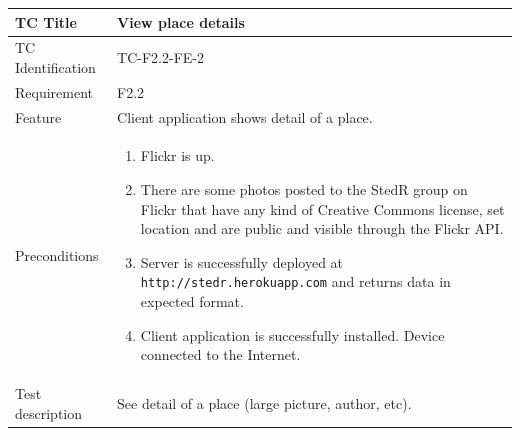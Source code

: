 \documentclass[11pt]{book}
\begin{document}
\begin{table}
  \begin{tabular}{| p{3cm} | p{9.5cm} |} \hline 
    TC Title              & View place details \\ \hline 
    TC Identification     & TC-F2.2-FE-2 \\ \hline 
    Requirement           & F2.2 \\ \hline 
    Feature               & Client application shows detail of a place. \\ \hline 
    Preconditions         & \begin{enumerate}
                              \item Flickr is up.
                              \item There are some photos posted to the StedR group on Flickr that have any kind of
                               Creative Commons license, set location and are public and visible through the Flickr API.
                              \item Server is successfully deployed at \texttt{http://stedr.herokuapp.com} and returns data in expected format.
                              \item Client application is successfully installed. Device connected to the Internet.
                            \end{enumerate} \\ \hline 

    Test description      & See detail of a place (large picture, author, etc).


\end{tabular}
\end{table}
\end{document}
